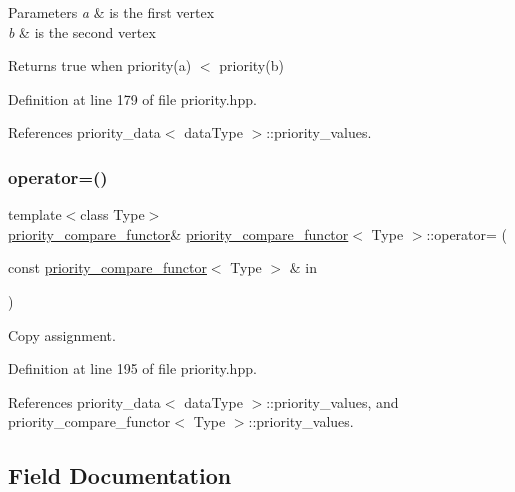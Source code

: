 \begin{DoxyParams}{Parameters}
{\em a} & is the first vertex \\
\hline
{\em b} & is the second vertex \\
\hline
\end{DoxyParams}
\begin{DoxyReturn}{Returns}
true when priority(a) $<$ priority(b) 
\end{DoxyReturn}


Definition at line 179 of file priority.\+hpp.



References priority\+\_\+data$<$ data\+Type $>$\+::priority\+\_\+values.

\mbox{\label{structpriority__compare__functor_a8ba10e1a3c85352aa5333633d555cb25}} 
\subsubsection{\texorpdfstring{operator=()}{operator=()}}
{\footnotesize\ttfamily template$<$class Type$>$ \\
\hyperlink{structpriority__compare__functor}{priority\+\_\+compare\+\_\+functor}\& \hyperlink{structpriority__compare__functor}{priority\+\_\+compare\+\_\+functor}$<$ Type $>$\+::operator= (\begin{DoxyParamCaption}\item[{const \hyperlink{structpriority__compare__functor}{priority\+\_\+compare\+\_\+functor}$<$ Type $>$ \&}]{in }\end{DoxyParamCaption})\hspace{0.3cm}{\ttfamily [inline]}}



Copy assignment. 



Definition at line 195 of file priority.\+hpp.



References priority\+\_\+data$<$ data\+Type $>$\+::priority\+\_\+values, and priority\+\_\+compare\+\_\+functor$<$ Type $>$\+::priority\+\_\+values.



\subsection{Field Documentation}
\mbox{\label{structpriority__compare__functor_acb4cba7f726af2a6da4250ae6d15e01f}} 

